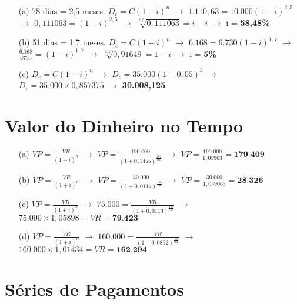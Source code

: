 \documentclass[report]{uftex}
\begin{document}
\begin{itemize}
	\item[(a)] 78 dias = 2,5 meses. $D_c = C(1-i)^n$ $\rightarrow$ $1.110,63 = 10.000(1-i)^{2,5}$ $\rightarrow$  $0,111063 = (1-i)^{2,5}$ $\rightarrow$ $\sqrt[2,5]{0,111063} = i-i$ $\rightarrow$ i = \textbf{58,48\%} 
	
	\item[(b)] 51 dias = 1,7 meses. $D_c = C(1-i)^n$ $\rightarrow$ $6.168 = 6.730(1-i)^{1,7}$ $\rightarrow$ $\frac{6.168}{6730} = (1-i)^{1,7}$ $\rightarrow$ $\sqrt[1,7]{0,91649} = 1-i$ $\rightarrow$ i = \textbf{5\%}
	
	\item[(c)] $D_c = C(1-i)^n$ $\rightarrow$ $D_c = 35.000(1-0,05)^3$ $\rightarrow$ $D_c = 35.000 \times 0,857375$ $\rightarrow$ \textbf{30.008,125}
	
\end{itemize}

\section{Valor do Dinheiro no Tempo}

\begin{itemize}
	\item[(a)] $VP = \frac{VR}{(1+i)^n}$ $\rightarrow$ $VP = \frac{190.000}{(1+0,1455)^\frac{152}{360}}$ $\rightarrow$ $VP = \frac{190.000}{1,05903} = \textbf{179.409}$
	 
	\item[(b)] $VP = \frac{VR}{(1+i)^n}$ $\rightarrow$ $VP = \frac{30.000}{(1+0,0117)^\frac{148}{30}}$ $\rightarrow$ $VP = \frac{30.000}{1,059063} = \textbf{28.326}$ 
	
	\item[(c)] $VP = \frac{VR}{(1+i)^n}$ $\rightarrow$ $75.000 = \frac{VR}{(1+0,0113)^\frac{153}{30}}$ $\rightarrow$ $75.000 \times 1,05898 = VR = \textbf{79.423}$
	
	\item[(d)]  $VP = \frac{VR}{(1+i)^n}$ $\rightarrow$ $160.000 = \frac{VR}{(1+0,0892)^\frac{60}{360}}$ $\rightarrow$ $160.000 \times 1,01434 = VR = \textbf{162.294}$ 
\end{itemize}

\section{Séries de Pagamentos}
\end{document}
